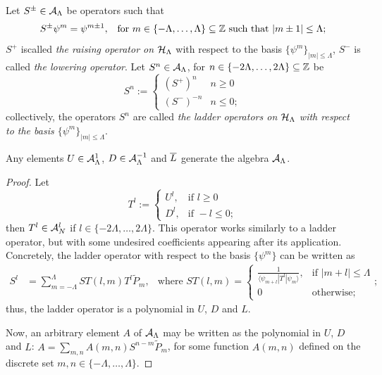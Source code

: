 \begin{definition}\label{definitionLadderOperatorsHLambda}
Let $S^\pm \in \mathcal A_{\Lambda}$ be operators such that
\begin{align}
    S^\pm \psi^m &= \psi^{m\pm 1}, & \text{for }m \in \{-\Lambda, \dots, \Lambda\} \subseteq \mathbb{Z} \text{ such that } |m \pm 1| \leq \Lambda;
\end{align}
$S^+$ iscalled \emph{the raising operator on $\mathcal H_\Lambda$} with respect to the basis $\{\psi^m\}_{|m| \leq \Lambda}$,  $S^-$ is called \emph{the lowering operator}. Let $S^n \in \mathcal A_\Lambda$, for $n \in \{-2\Lambda, \dots, 2\Lambda\} \subseteq \mathbb{Z}$ be
\begin{equation}
    S^n := \begin{cases}
    (S^+)^n & n \geq 0\\
    (S^-)^{-n} & n \leq 0;
    \end{cases}
\end{equation}
collectively, the operators $S^n$ are called \textit{the ladder operators on $\mathcal H_\Lambda$ with respect to the basis $\{\psi^m\}_{|m|\leq \Lambda}$}.
\end{definition}

\begin{lemma}\label{lemmaLUDScalarAngularMomentumGenerateD2}
Any elements $U \in \mathcal A^1_\Lambda$, $D \in \mathcal A^{-1}_\Lambda$ and $\overline{L}$ generate the algebra $\mathcal A_\Lambda$.
\end{lemma}
\begin{proof}
Let
\begin{equation*}
    T^l := 
    \begin{cases}
    U^l, &   \text{if } l \geq 0\\
    D^l, &   \text{if } -l \leq 0;
    \end{cases}
\end{equation*}
then $T^l \in \mathcal A_N^l$ if $l \in \{-2\Lambda, \dots, 2\Lambda\}$. This operator works similarly to a ladder operator, but with some undesired coefficients appearing after its application. Concretely, the ladder operator with respect to the basis $\{\psi^m\}$ can be written as
\begin{align}\label{equationFormulaGeneralLadderOperatorD2}
    S^l &= \sum_{m = -\Lambda}^\Lambda ST(l,m) T^l \tilde P_m, & \text{where }
    ST(l,m) =
        \begin{cases}
        \frac{1}{\langle \psi_{m+l}| T^l | \psi_{m}\rangle}, & \text{if } |m+l| \leq \Lambda\\
        0 & \text{otherwise;}
        \end{cases};
\end{align}
thus, the ladder operator is a polynomial in $U$, $D$ and $L$.

Now, an arbitrary element $A$ of $\mathcal A_\Lambda$ may be written as the polynomial in $U$, $D$ and $L$: $A =\sum_{m,n} A(m,n) S^{n-m} \tilde P_m$, for some function $A(m,n)$ defined on the discrete set $m,n \in \{-\Lambda, \dots, \Lambda\}$.
\end{proof}

